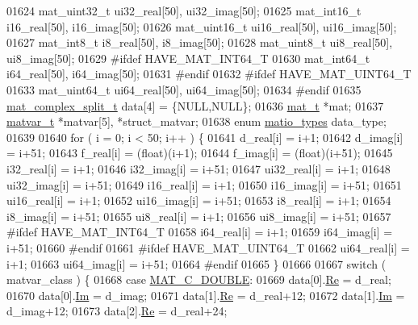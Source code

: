 \begin{DoxyCode}
{{{{{01624     mat\_uint32\_t ui32\_real[50], ui32\_imag[50];
01625     mat\_int16\_t   i16\_real[50], i16\_imag[50];
01626     mat\_uint16\_t ui16\_real[50], ui16\_imag[50];
01627     mat\_int8\_t    i8\_real[50], i8\_imag[50];
01628     mat\_uint8\_t  ui8\_real[50], ui8\_imag[50];
01629 \textcolor{preprocessor}{#ifdef HAVE\_MAT\_INT64\_T}
01630     mat\_int64\_t i64\_real[50], i64\_imag[50];
01631 \textcolor{preprocessor}{#endif}
01632 \textcolor{preprocessor}{#ifdef HAVE\_MAT\_UINT64\_T}
01633     mat\_uint64\_t ui64\_real[50], ui64\_imag[50];
01634 \textcolor{preprocessor}{#endif}
01635     \hyperlink{group___m_a_t_structmat__complex__split__t}{mat\_complex\_split\_t} data[4] = \{NULL,NULL\};
01636     \hyperlink{struct__mat__t}{mat\_t} *mat;
01637     \hyperlink{group___m_a_t_structmatvar__t}{matvar\_t} *matvar[5], *struct\_matvar;
01638     \textcolor{keyword}{enum} \hyperlink{group___m_a_t_gacf7b3b879282b7ab3a51190e49bf3453}{matio\_types} data\_type;
01639 
01640     \textcolor{keywordflow}{for} ( i = 0; i < 50; i++ ) \{
01641           d\_real[i] = i+1;
01642           d\_imag[i] = i+51;
01643           f\_real[i] = (float)(i+1);
01644           f\_imag[i] = (float)(i+51);
01645         i32\_real[i] = i+1;
01646         i32\_imag[i] = i+51;
01647        ui32\_real[i] = i+1;
01648        ui32\_imag[i] = i+51;
01649         i16\_real[i] = i+1;
01650         i16\_imag[i] = i+51;
01651        ui16\_real[i] = i+1;
01652        ui16\_imag[i] = i+51;
01653          i8\_real[i] = i+1;
01654          i8\_imag[i] = i+51;
01655         ui8\_real[i] = i+1;
01656         ui8\_imag[i] = i+51;
01657 \textcolor{preprocessor}{#ifdef HAVE\_MAT\_INT64\_T}
01658         i64\_real[i] = i+1;
01659         i64\_imag[i] = i+51;
01660 \textcolor{preprocessor}{#endif}
01661 \textcolor{preprocessor}{#ifdef HAVE\_MAT\_UINT64\_T}
01662         ui64\_real[i] = i+1;
01663         ui64\_imag[i] = i+51;
01664 \textcolor{preprocessor}{#endif}
01665     \}
01666 
01667     \textcolor{keywordflow}{switch} ( matvar\_class ) \{
01668         \textcolor{keywordflow}{case} \hyperlink{group___m_a_t_ggad4d60ae7b709fc81bfd744fb4c857c40a5d70e0862e5bdb7bd86bf7ba5948f307}{MAT\_C\_DOUBLE}:
01669             data[0].\hyperlink{group___m_a_t_a484a93607508adac2bce53a0252e0325}{Re} = d\_real;
01670             data[0].\hyperlink{group___m_a_t_a7182d10b0d3598415887376065440946}{Im} = d\_imag;
01671             data[1].\hyperlink{group___m_a_t_a484a93607508adac2bce53a0252e0325}{Re} = d\_real+12;
01672             data[1].\hyperlink{group___m_a_t_a7182d10b0d3598415887376065440946}{Im} = d\_imag+12;
01673             data[2].\hyperlink{group___m_a_t_a484a93607508adac2bce53a0252e0325}{Re} = d\_real+24;
}}}}}
\end{DoxyCode}
